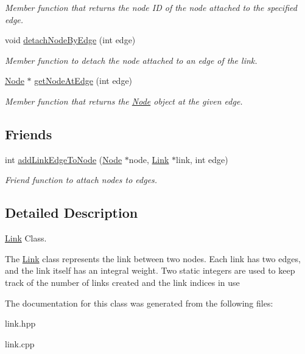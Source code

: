 \begin{DoxyCompactItemize}
\begin{DoxyCompactList}\small\item\em Member function that returns the node I\-D of the node attached to the specified edge. \end{DoxyCompactList}\item 
\hypertarget{classLink_a16589e17a3f22a5038b3c708d70bf5ea}{void \hyperlink{classLink_a16589e17a3f22a5038b3c708d70bf5ea}{detach\-Node\-By\-Edge} (int edge)}\label{classLink_a16589e17a3f22a5038b3c708d70bf5ea}

\begin{DoxyCompactList}\small\item\em Member function to detach the node attached to an edge of the link. \end{DoxyCompactList}\item 
\hypertarget{classLink_a901e3ffdb61055396977a5418d446535}{\hyperlink{classNode}{Node} $\ast$ \hyperlink{classLink_a901e3ffdb61055396977a5418d446535}{get\-Node\-At\-Edge} (int edge)}\label{classLink_a901e3ffdb61055396977a5418d446535}

\begin{DoxyCompactList}\small\item\em Member function that returns the \hyperlink{classNode}{Node} object at the given edge. \end{DoxyCompactList}\end{DoxyCompactItemize}
\subsection*{Friends}
\begin{DoxyCompactItemize}
\item 
\hypertarget{classLink_a1cccce22df97e21e1e0e0cd3ca6526b0}{int \hyperlink{classLink_a1cccce22df97e21e1e0e0cd3ca6526b0}{add\-Link\-Edge\-To\-Node} (\hyperlink{classNode}{Node} $\ast$node, \hyperlink{classLink}{Link} $\ast$link, int edge)}\label{classLink_a1cccce22df97e21e1e0e0cd3ca6526b0}

\begin{DoxyCompactList}\small\item\em Friend function to attach nodes to edges. \end{DoxyCompactList}\end{DoxyCompactItemize}


\subsection{Detailed Description}
\hyperlink{classLink}{Link} Class. 

The \hyperlink{classLink}{Link} class represents the link between two nodes. Each link has two edges, and the link itself has an integral weight. Two static integers are used to keep track of the number of links created and the link indices in use 

The documentation for this class was generated from the following files\-:\begin{DoxyCompactItemize}
\item 
link.\-hpp\item 
link.\-cpp\end{DoxyCompactItemize}
